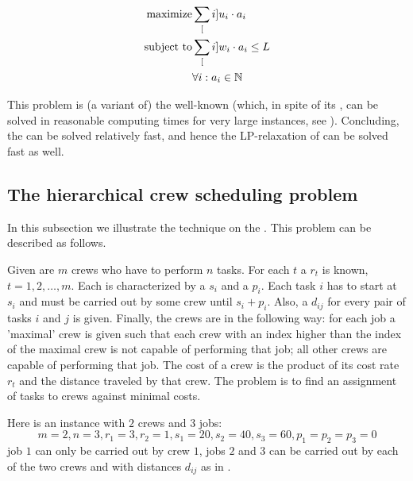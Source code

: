 \begin{eqnarray}
\mbox{maximize}&\sum_[i]{u_i\cdot a_i}\eqnlab{pricing-m}\\
\mbox{subject to}&\sum_[i]{w_i\cdot a_i}\leq L\eqnlab{pricing-c1}\\
&\forall i:a_i\in\NNN\eqnlab{pricing-c2}
\end{eqnarray}

This problem is (a variant of) the well-known  (which, in spite of its , can be solved in reasonable computing times for very large instances, see ). Concluding, the  can be solved relatively fast, and hence the LP-relaxation of  can be solved fast as well.

\subsection{The hierarchical crew scheduling problem}

In this subsection we illustrate the  technique on the . This problem can be described as follows.

\begin{definition}
Given are $m$ crews who have to perform $n$ tasks. For each  $t$ a  $r_t$ is known, $t=1,2,\ldots,m$. Each  is characterized by a  $s_i$ and a  $p_i$. Each task $i$ has to start at $s_i$ and must be carried out  by some crew until $s_i+p_i$. Also, a  $d_{ij}$ for every pair of tasks $i$ and $j$ is given. Finally, the crews are  in the following way: for each job a 'maximal' crew is given such that each crew with an index higher than the index of the maximal crew is not capable of performing that job; all other crews are capable of performing that job. The cost of a crew is the product of its cost rate $r_t$ and the distance traveled by that crew. The problem is to find an assignment of tasks to crews against minimal costs.
\end{definition}

\begin{example}
Here is an instance with $2$ crews and $3$ jobs:
\begin{equation}
m=2, n=3, r_1=3, r_2=1, s_1=20, s_2=40, s_3=60, p_1=p_2=p_3=0
\end{equation}
job $1$ can only be carried out by crew $1$, jobs $2$ and $3$ can be carried out by each of the two crews and with distances $d_{ij}$ as in .
\end{example}

